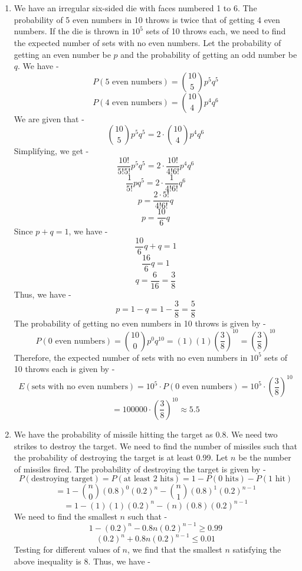 \chapter{}
\begin{enumerate}
    \item We have an irregular six-sided die with faces numbered 1 to 6. The probability of 5 even numbers in 10 throws is twice that of getting 4 even numbers. If the die is thrown in $10^5$ sets of 10 throws each, we need to find the expected number of sets with no even numbers.
    Let the probability of getting an even number be $p$ and the probability of getting an odd number be $q$. We have -
    \[P(\text{5 even numbers}) = \binom{10}{5} p^5 q^5\]
    \[P(\text{4 even numbers}) = \binom{10}{4} p^4 q^6\]
    We are given that -
    \[\binom{10}{5} p^5 q^5 = 2 \cdot \binom{10}{4} p^4 q^6\]
    Simplifying, we get -
    \[\frac{10!}{5!5!} p^5 q^5 = 2 \cdot \frac{10!}{4!6!} p^4 q^6\]
    \[\frac{1}{5!} p q^5 = 2 \cdot \frac{1}{4!6!} q^6\]
    \[p = \frac{2 \cdot 5!}{4!6!} q\]
    \[p = \frac{10}{6} q\]
    Since $p + q = 1$, we have -
    \[\frac{10}{6} q + q = 1\]
    \[\frac{16}{6} q = 1\]
    \[q = \frac{6}{16} = \frac{3}{8}\]
    Thus, we have -
    \[p = 1 - q = 1 - \frac{3}{8} = \frac{5}{8}\]
    The probability of getting no even numbers in 10 throws is given by -
    \[P(\text{0 even numbers}) = \binom{10}{0} p^0 q^{10} = (1)(1)\left(\frac{3}{8}\right)^{10} = \left(\frac{3}{8}\right)^{10}\]
    Therefore, the expected number of sets with no even numbers in $10^5$ sets of 10 throws each is given by -
    \[E(\text{sets with no even numbers}) = 10^5 \cdot P(\text{0 even numbers}) = 10^5 \cdot \left(\frac{3}{8}\right)^{10}\]
    \[\boxed{= 100000 \cdot \left(\frac{3}{8}\right)^{10} \approx 5.5
    }\]
    \item We have the probability of missile hitting the target as 0.8. We need two strikes to destroy the target. We need to find the number of missiles such that the probability of destroying the target is at least 0.99.
    Let $n$ be the number of missiles fired. The probability of destroying the target is given by -
    \[P(\text{destroying target}) = P(\text{at least 2 hits}) = 1 - P(\text{0 hits}) - P(\text{1 hit})\]
    \[= 1 - \binom{n}{0} (0.8)^0 (0.2)^n - \binom{n}{1} (0.8)^1 (0.2)^{n-1}\]
    \[= 1 - (1)(1)(0.2)^n - (n)(0.8)(0.2)^{n-1}\]
    We need to find the smallest $n$ such that -
    \[1 - (0.2)^n - 0.8n(0.2)^{n-1} \geq 0.99\]
    \[(0.2)^n + 0.8n(0.2)^{n-1} \leq 0.01\]
    Testing for different values of $n$, we find that the smallest $n$ satisfying the above inequality is 8. Thus, we have -

\end{enumerate}
